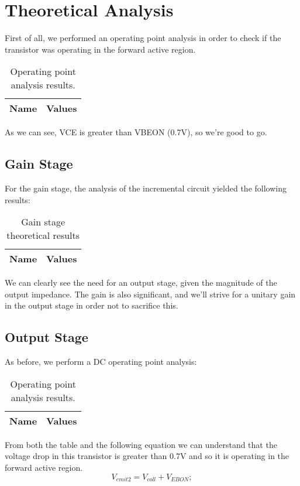 \section{Theoretical Analysis}
\label{sec:analysis}
First of all, we performed an operating point analysis in order to check if the transistor was operating in the forward active region.
\begin{table}[h!]
  \centering
  \begin{tabular}{|l|r|}
    \hline    
    {\bf Name} & {\bf Values} \\ \hline
     
  \end{tabular}
  \caption{Operating point analysis results.}
  \label{tab:data}
\end{table}

As we can see, VCE is greater than VBEON (0.7V), so we're good to go.
\subsection{Gain Stage}
For the gain stage, the analysis of the incremental circuit yielded the following results:
\begin{table}[h]
  \centering
  \begin{tabular}{|l|r|}
    \hline    
    {\bf Name} & {\bf Values} \\ \hline
     
  \end{tabular}
  \caption{Gain stage theoretical results}
  \label{tab:gain}
\end{table}

We can clearly see the need for an output stage, given the magnitude of the output impedance. The gain is also significant, and we'll strive for a unitary gain in the output stage in order not to sacrifice this.

\subsection{Output Stage}
As before, we perform a DC operating point analysis:
\begin{table}[h!]
  \centering
  \begin{tabular}{|l|r|}
    \hline    
    {\bf Name} & {\bf Values} \\ \hline
     
  \end{tabular}
  \caption{Operating point analysis results.}
  \label{tab:data2}
\end{table}
From both the table and the following equation we can understand that the voltage drop in this transistor is greater than 0.7V and so it is operating in the forward active region.
\begin{equation}
\label{eqn:collector}
V_{emit2}=V_{coll}+V_{EBON};
\end{equation}

